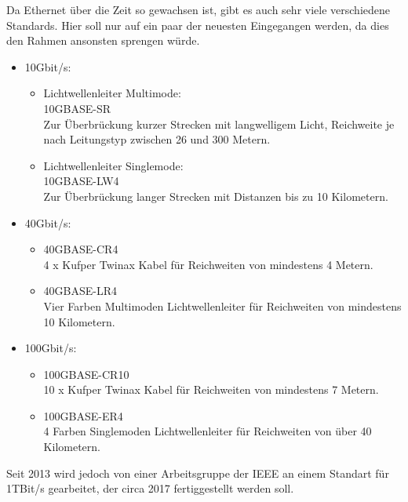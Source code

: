 \documentclass[12pt,a4paper]{report}
\begin{document}
Da Ethernet über die Zeit so gewachsen ist, gibt es auch sehr viele verschiedene Standards. Hier soll nur auf ein paar der neuesten Eingegangen werden, da dies den Rahmen ansonsten sprengen würde.\\
\begin{itemize}
\item 10Gbit/s:
\begin{itemize}
\item Lichtwellenleiter Multimode:\\
10GBASE-SR\\
Zur Überbrückung kurzer Strecken mit langwelligem Licht, Reichweite je nach Leitungstyp zwischen 26 und 300 Metern.
\item Lichtwellenleiter Singlemode:\\
10GBASE-LW4\\
Zur Überbrückung langer Strecken mit Distanzen bis zu 10 Kilometern.
\end{itemize}
\item 40Gbit/s:
\begin{itemize}
\item 40GBASE-CR4\\
4 x Kufper Twinax Kabel für Reichweiten von mindestens 4 Metern.
\item 40GBASE-LR4\\
Vier Farben Multimoden Lichtwellenleiter für Reichweiten von mindestens 10 Kilometern.
\end{itemize}
\item 100Gbit/s:
\begin{itemize}
\item 100GBASE-CR10\\
10 x Kufper Twinax Kabel für Reichweiten von mindestens 7 Metern.
\item 100GBASE-ER4\\
4 Farben Singlemoden Lichtwellenleiter für Reichweiten von über 40 Kilometern.
\end{itemize}
\end{itemize}
Seit 2013 wird jedoch von einer Arbeitsgruppe der IEEE an einem Standart für 1TBit/s gearbeitet, der circa 2017 fertiggestellt werden soll.\\
\end{document}
